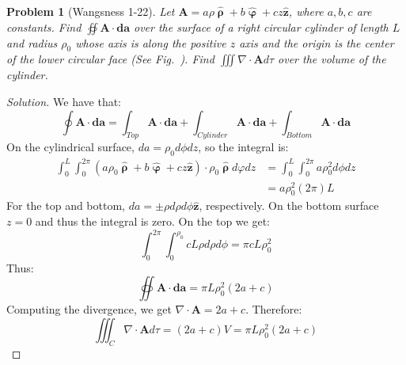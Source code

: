 \documentclass[oneside]{book}
\theoremstyle{mystyle}
\newtheorem{problem}{Problem}[section]
\begin{document}
\begin{problem}[Wangsness 1-22]
Let $\mathbf{A} = a\rho\hat{\boldsymbol{\uprho}} + b\hat{\boldsymbol{\upvarphi}}+cz\hat{\mathbf{z}}$, where $a,b,c$ are constants. Find $\oiint \mathbf{A}\cdot \boldsymbol{da}$ over the surface of a right circular cylinder of length $L$ and radius $\rho_{0}$ whose axis is along the positive $z$ axis and the origin is the center of the lower circular face (See Fig.~). Find $\iiint \nabla \cdot \mathbf{A}d\tau$ over the volume of the cylinder.
\end{problem}
\begin{proof}[Solution]
We have that:
\begin{equation*}
    \oint \mathbf{A}\cdot \boldsymbol{da} = \int_{Top} \mathbf{A}\cdot \boldsymbol{da}+\int_{Cylinder} \mathbf{A}\cdot \boldsymbol{da} + \int_{Bottom} \mathbf{A}\cdot \boldsymbol{da}
\end{equation*}
On the cylindrical surface, $da = \rho_0 d\phi dz$, so the integral is:
\begin{align*}
    \int_{0}^{L}\int_{0}^{2\pi}(a\rho_0\hat{\boldsymbol{\uprho}}+b\hat{\boldsymbol{\upvarphi}}+cz\hat{\mathbf{z}})\cdot \rho_0 \hat{\boldsymbol{\uprho}}d\varphi dz &= \int_{0}^{L}\int_{0}^{2\pi}a\rho_0^2 d\phi dz\\
    &= a\rho_0^2(2\pi)L    
\end{align*}
For the top and bottom, $da = \pm \rho d\rho d\phi \hat{\mathbf{z}}$, respectively. On the bottom surface $z=0$ and thus the integral is zero. On the top we get:
\begin{equation*}
\int_{0}^{2\pi}\int_{0}^{\rho_0}cL\rho d\rho d\phi = \pi cL \rho_0^2
\end{equation*}
%
Thus:
%
\begin{equation*}
\oiint \mathbf{A}\cdot \boldsymbol{da} = \pi L \rho_0^2(2a+c)
\end{equation*}
%
Computing the divergence, we get $\nabla \cdot \mathbf{A} = 2a+c$. Therefore:
\begin{equation*}
    \iiint_C \nabla \cdot \mathbf{A} d\tau = (2a+c) V = \pi L \rho_0^2(2a+c)
\end{equation*}
\end{proof}
\end{document}
